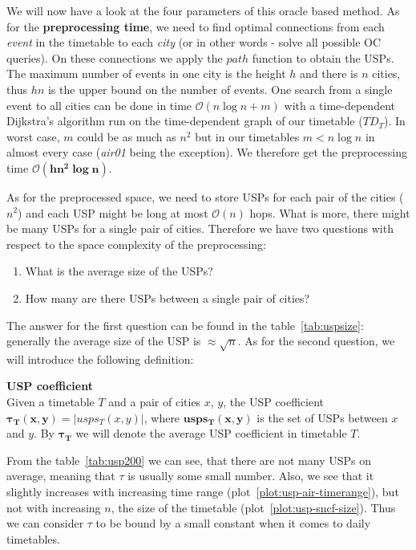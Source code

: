 	\noindent We will now have a look at the four parameters of this oracle based method. As for the \textbf{preprocessing time}, we need to find optimal connections from each \textit{event} in the timetable to each \textit{city} (or in other words - solve all possible OC queries). On these connections we apply the $path$ function to obtain the USPs. The maximum number of events in one city is the height $h$ and there is $n$ cities, thus $hn$ is the upper bound on the number of events. One search from a single event to all cities can be done in time $\mathcal{O}(n \log n + m)$ with a time-dependent Dijkstra's algorithm run on the time-dependent graph of our timetable ($TD_{T}$). In worst case, $m$ could be as much as $n^{2}$ but in our timetables $m < n \log n$ in almost every case (\textit{air01} being the exception). We therefore get the preprocessing time $\bm{\mathcal{O}(hn^{2} \log n)}$. 
	
	As for the preprocessed space, we need to store USPs for each pair of the cities ($n^{2}$) and each USP might be long at most $\mathcal{O}(n)$ hops. What is more, there might be many USPs for a single pair of cities. Therefore we have two questions with respect to the space complexity of the preprocessing:
	\begin{enumerate}
		\item What is the average size of the USPs?
		\item How many are there USPs between a single pair of cities?
	\end{enumerate}
	\hspace*{\fill}
	
	\noindent The answer for the first question can be found in the table~\ref{tab:uspsize}: generally the average size of the USP is $\approx \sqrt{n}$. As for the second question, we will introduce the following definition:
	
	\begin{definition}
        \textbf{USP coefficient} \\
		Given a timetable $T$ and a pair of cities $x$, $y$, the USP coefficient $\bm{\tau_{T}(x, y)} = |usps_{T}(x, y)|$, where $\bm{usps_{T}(x, y)}$ is the set of USPs between $x$ and $y$. By $\bm{\tau_{T}}$ we will denote the average USP coefficient in timetable $T$.
    \end{definition}
    
    \noindent From the table~\ref{tab:usp200} we can see, that there are not many USPs on average, meaning that $\tau$ is usually some small number. Also, we see that it slightly increases with increasing time range (plot~\ref{plot:usp-air-timerange}), but not with increasing $n$, the size of the timetable (plot~\ref{plot:usp-sncf-size}). Thus we can consider $\tau$ to be bound by a small constant when it comes to daily timetables. 
    

